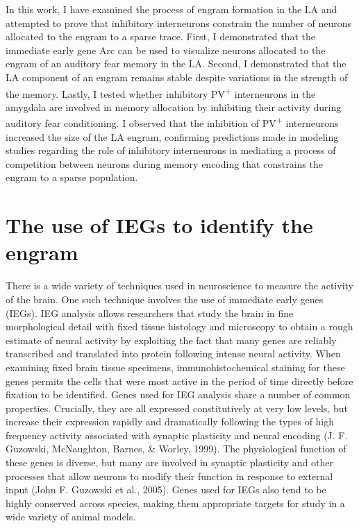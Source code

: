 \documentclass[12pt,a4paperpaper,]{report}
\begin{document}
In this work, I have examined the process of engram formation in the LA
and attempted to prove that inhibitory interneurons constrain the number
of neurons allocated to the engram to a sparse trace. First, I
demonstrated that the immediate early gene Arc can be used to visualize
neurons allocated to the engram of an auditory fear memory in the LA.
Second, I demonstrated that the LA component of an engram remains stable
despite variations in the strength of the memory. Lastly, I tested
whether inhibitory PV\textsuperscript{+} interneurons in the amygdala
are involved in memory allocation by inhibiting their activity during
auditory fear conditioning. I observed that the inhibition of
PV\textsuperscript{+} interneurons increased the size of the LA engram,
confirming predictions made in modeling studies regarding the role of
inhibitory interneurons in mediating a process of competition between
neurons during memory encoding that constrains the engram to a sparse
population.

\section{The use of IEGs to identify the
engram}\label{the-use-of-iegs-to-identify-the-engram}

There is a wide variety of techniques used in neuroscience to measure
the activity of the brain. One such technique involves the use of
immediate early genes (IEGs). IEG analysis allows researchers that study
the brain in fine morphological detail with fixed tissue histology and
microscopy to obtain a rough estimate of neural activity by exploiting
the fact that many genes are reliably transcribed and translated into
protein following intense neural activity. When examining fixed brain
tissue specimens, immunohistochemical staining for these genes permits
the cells that were most active in the period of time directly before
fixation to be identified. Genes used for IEG analysis share a number of
common properties. Crucially, they are all expressed constitutively at
very low levels, but increase their expression rapidly and dramatically
following the types of high frequency activity associated with synaptic
plasticity and neural encoding (J. F. Guzowski, McNaughton, Barnes, \&
Worley, 1999). The physiological function of these genes is diverse, but
many are involved in synaptic plasticity and other processes that allow
neurons to modify their function in response to external input (John F.
Guzowski et al., 2005). Genes used for IEGs also tend to be highly
conserved across species, making them appropriate targets for study in a
wide variety of animal models.
\end{document}
